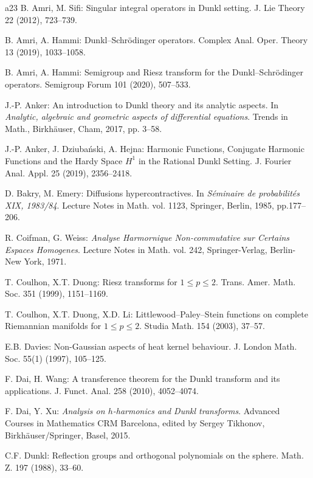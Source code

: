 \documentclass[11pt,a4paper]{article}
\theoremstyle{definition}\newtheorem{remark}[theorem]{Remark}
\begin{document}
\begin{thebibliography}{a23}
B. Amri, M. Sifi: Singular integral operators in Dunkl setting. J. Lie Theory 22 (2012), 723--739.

B. Amri, A. Hammi: Dunkl--Schr\"{o}dinger operators. Complex Anal. Oper. Theory 13 (2019), 1033--1058.

B. Amri, A. Hammi: Semigroup and Riesz transform for the Dunkl--Schr\"{o}dinger operators. Semigroup Forum 101 (2020), 507--533.

J.-P. Anker: An introduction to Dunkl theory and its analytic aspects. In \emph{Analytic, algebraic and geometric aspects of differential equations}. Trends in Math., Birkh\"{a}user, Cham, 2017, pp. 3--58.

J.-P. Anker, J. Dziuba\'{n}ski, A. Hejna: Harmonic Functions, Conjugate Harmonic Functions and the Hardy Space $H^1$ in the Rational Dunkl Setting. J. Fourier Anal. Appl. 25 (2019), 2356--2418.

 D. Bakry, M. Emery: Diffusions hypercontractives. In \emph{S\'{e}minaire de probabilit\'{e}s XIX, 1983/84}. Lecture Notes in Math. vol. 1123, Springer, Berlin, 1985, pp.177--206.

R. Coifman, G. Weiss: \emph{Analyse Harmornique Non-commutative sur Certains Espaces Homogenes}. Lecture Notes in Math. vol. 242, Springer-Verlag,
Berlin-New York, 1971.

T. Coulhon, X.T. Duong: Riesz transforms for $1\leq p\leq2$. Trans. Amer. Math. Soc. 351 (1999), 1151--1169.

T. Coulhon, X.T. Duong, X.D. Li: Littlewood--Paley--Stein functions on complete Riemannian manifolds for $1\le p\le 2$. Studia Math. 154 (2003), 37--57.

E.B. Davies: Non-Gaussian aspects of heat kernel behaviour. J. London Math. Soc. 55(1) (1997), 105--125.


 F. Dai, H. Wang: A transference theorem for the Dunkl transform and its applications. J. Funct. Anal. 258 (2010), 4052--4074.

F. Dai, Y. Xu: \emph{Analysis on $h$-harmonics and Dunkl transforms}. Advanced Courses in Mathematics CRM Barcelona, edited by Sergey Tikhonov,  Birkh\"{a}user/Springer, Basel, 2015.

C.F. Dunkl: Reflection groups and orthogonal polynomials on the sphere. Math. Z. 197 (1988), 33--60.


\end{thebibliography}
\end{document}
